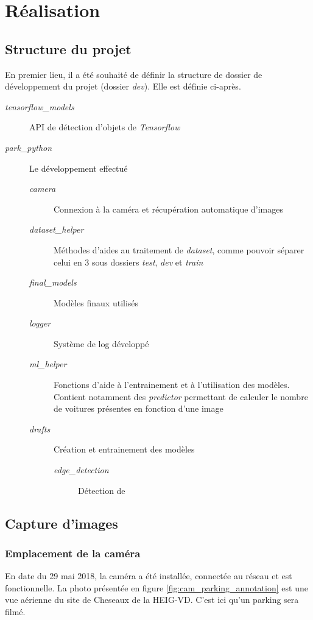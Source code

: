 \chapter{Réalisation}\label{realisation}
\section{Structure du projet}

En premier lieu, il a été souhaité de définir la structure de dossier de développement du projet (dossier \textit{dev}). Elle est définie ci-après.

\begin{description}
    \item[\textit{tensorflow\_models}] API de détection d'objets de \textit{Tensorflow}
    \item[\textit{park\_python}] Le développement effectué
    \begin{description}
        \item[\textit{camera}] Connexion à la caméra et récupération automatique d'images
        \item[\textit{dataset\_helper}] Méthodes d'aides au traitement de \textit{dataset}, comme pouvoir séparer celui en 3 sous dossiers \textit{test}, \textit{dev} et \textit{train}
        \item[\textit{final\_models}] Modèles finaux utilisés
        \item[\textit{logger}] Système de log développé
        \item[\textit{ml\_helper}] Fonctions d'aide à l'entrainement et à l'utilisation des modèles. Contient notamment des \textit{predictor} permettant de calculer le nombre de voitures présentes en fonction d'une image
        \item[\textit{drafts}] Création et entrainement des modèles
        \begin{description}
            \item[\textit{edge\_detection}] Détection de 
        \end{description}
    \end{description}
\end{description}


\section{Capture d'images}\label{realisation.capture}
\subsection{Emplacement de la caméra}
En date du 29 mai 2018, la caméra a été installée, connectée au réseau et est fonctionnelle. La photo présentée en figure \ref{fig:cam_parking_annotation} est une vue aérienne du site de Cheseaux de la HEIG-VD. C'est ici qu'un parking sera filmé.

